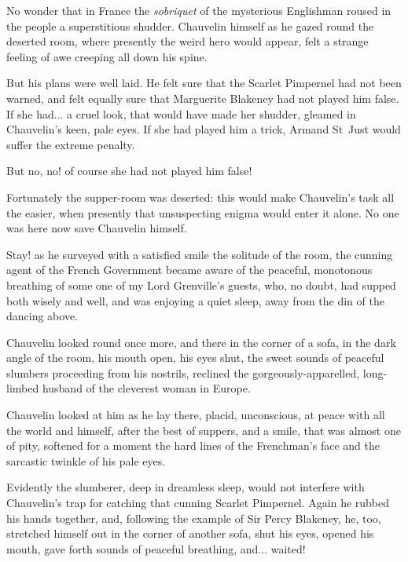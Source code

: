 No wonder that in France the \textit{sobriquet} of the mysterious Englishman roused in the people a superstitious shudder. Chauvelin himself as he gazed round the deserted room, where presently the weird hero would appear, felt a strange feeling of awe creeping all down his spine.

But his plans were well laid. He felt sure that the Scarlet Pimpernel had not been warned, and felt equally sure that Marguerite Blakeney had not played him false. If she had... a cruel look, that would have made her shudder, gleamed in Chauvelin's keen, pale eyes. If she had played him a trick, Armand St~Just would suffer the extreme penalty.

But no, no! of course she had not played him false!

Fortunately the supper-room was deserted: this would make Chauvelin's task all the easier, when presently that unsuspecting enigma would enter it alone. No one was here now save Chauvelin himself.

Stay! as he surveyed with a satisfied smile the solitude of the room, the cunning agent of the French Government became aware of the peaceful, monotonous breathing of some one of my Lord Grenville's guests, who, no doubt, had supped both wisely and well, and was enjoying a quiet sleep, away from the din of the dancing above.

Chauvelin looked round once more, and there in the corner of a sofa, in the dark angle of the room, his mouth open, his eyes shut, the sweet sounds of peaceful slumbers proceeding from his nostrils, reclined the gorgeously-apparelled, long-limbed husband of the cleverest woman in Europe.

Chauvelin looked at him as he lay there, placid, unconscious, at peace with all the world and himself, after the best of suppers, and a smile, that was almost one of pity, softened for a moment the hard lines of the Frenchman's face and the sarcastic twinkle of his pale eyes.

Evidently the slumberer, deep in dreamless sleep, would not interfere with Chauvelin's trap for catching that cunning Scarlet Pimpernel. Again he rubbed his hands together, and, following the example of Sir Percy Blakeney, he, too, stretched himself out in the corner of another sofa, shut his eyes, opened his mouth, gave forth sounds of peaceful breathing, and... waited!